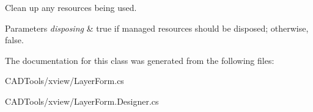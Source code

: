 Clean up any resources being used. 


\begin{DoxyParams}{Parameters}
{\em disposing} & true if managed resources should be disposed; otherwise, false.\\
\hline
\end{DoxyParams}


The documentation for this class was generated from the following files\+:\begin{DoxyCompactItemize}
\item 
C\+A\+D\+Tools/xview/Layer\+Form.\+cs\item 
C\+A\+D\+Tools/xview/Layer\+Form.\+Designer.\+cs\end{DoxyCompactItemize}
